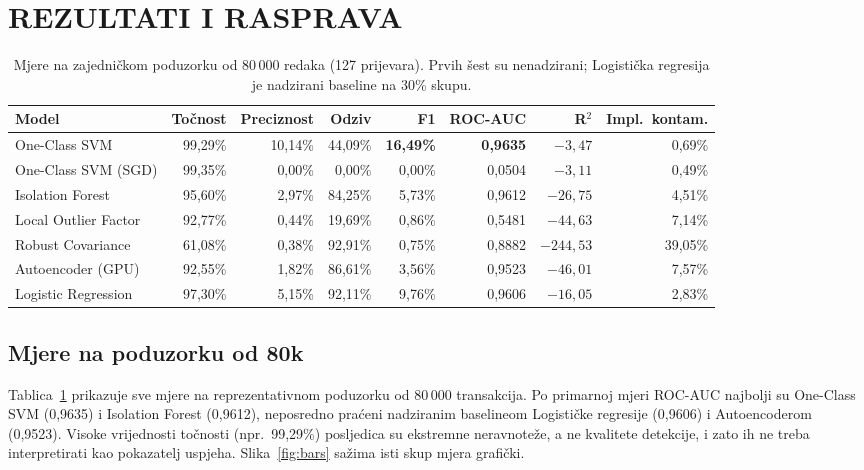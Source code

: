 \documentclass[letterpaper, 10pt, conference]{ieeeconf}
\begin{document}
\section{\textbf{REZULTATI I RASPRAVA}}

\begin{table}[t]
\caption{Mjere na zajedničkom poduzorku od 80\,000 redaka (127 prijevara). Prvih šest su nenadzirani; Logistička regresija je nadzirani baseline na 30\% skupu.}
\label{tab:main80k}
\centering
\begin{tabular}{@{}lrrrrrrr@{}}
\toprule
Model & Točnost & Preciznost & Odziv & F1 & ROC-AUC & R$^2$ & Impl.\ kontam. \\
\midrule
One-Class SVM         & 99,29\% & 10,14\% & 44,09\% & \textbf{16,49\%} & \textbf{0,9635} & $-3{,}47$  & 0,69\% \\
One-Class SVM (SGD)   & 99,35\% & 0,00\%  & 0,00\%  & 0,00\%  & 0,0504 & $-3{,}11$   & 0,49\% \\
Isolation Forest      & 95,60\% & 2,97\%  & 84,25\% & 5,73\%  & 0,9612 & $-26{,}75$  & 4,51\% \\
Local Outlier Factor  & 92,77\% & 0,44\%  & 19,69\% & 0,86\%  & 0,5481 & $-44{,}63$  & 7,14\% \\
Robust Covariance     & 61,08\% & 0,38\%  & 92,91\% & 0,75\%  & 0,8882 & $-244{,}53$ & 39,05\% \\
Autoencoder (GPU)     & 92,55\% & 1,82\%  & 86,61\% & 3,56\%  & 0,9523 & $-46{,}01$  & 7,57\% \\
Logistic Regression   & 97,30\% & 5,15\%  & 92,11\% & 9,76\%  & 0,9606 & $-16{,}05$  & 2,83\% \\
\bottomrule
\end{tabular}
\end{table}

\subsection{Mjere na poduzorku od 80k}

Tablica~\ref{tab:main80k} prikazuje sve mjere na reprezentativnom poduzorku od 80\,000 transakcija. Po primarnoj mjeri ROC-AUC najbolji su One-Class SVM (0,9635) i Isolation Forest (0,9612), neposredno praćeni nadziranim baselineom Logističke regresije (0,9606) i Autoencoderom (0,9523). Visoke vrijednosti točnosti (npr.\ 99,29\%) posljedica su ekstremne neravnoteže, a ne kvalitete detekcije, i zato ih ne treba interpretirati kao pokazatelj uspjeha. Slika~\ref{fig:bars} sažima isti skup mjera grafički.
\end{document}
